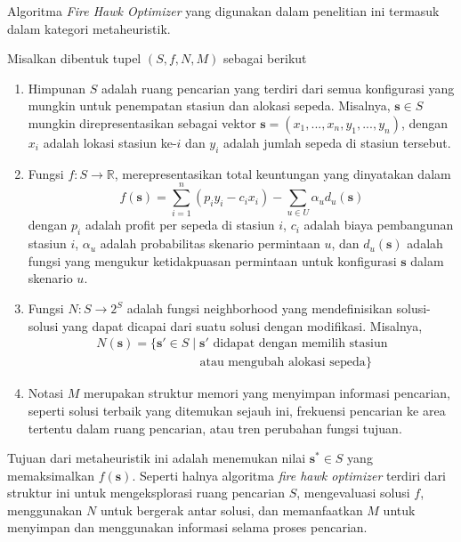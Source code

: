 Algoritma \textit{Fire Hawk Optimizer} yang digunakan dalam penelitian ini termasuk dalam kategori metaheuristik.

\begin{contoh}
Misalkan dibentuk tupel $(S, f, N, M)$ sebagai berikut
\begin{enumerate}
    \item Himpunan $S$ adalah ruang pencarian yang terdiri dari semua konfigurasi yang mungkin untuk penempatan stasiun dan alokasi sepeda. Misalnya, $\boldsymbol{s} \in S$ mungkin direpresentasikan sebagai vektor $\boldsymbol{s} = (x_1, ..., x_n, y_1, ..., y_n)$, dengan $x_i$ adalah lokasi stasiun ke-$i$ dan $y_i$ adalah jumlah sepeda di stasiun tersebut.
    
    \item Fungsi $f: S \rightarrow \mathbb{R}$, merepresentasikan total keuntungan yang dinyatakan dalam 
    $$f(\boldsymbol{s}) = \sum_{i=1}^n (p_i y_i - c_i x_i) - \sum_{u \in U} \alpha_u d_u(\boldsymbol{s})$$
    dengan $p_i$ adalah profit per sepeda di stasiun $i$, $c_i$ adalah biaya pembangunan stasiun $i$, $\alpha_u$ adalah probabilitas skenario permintaan $u$, dan $d_u(\boldsymbol{s})$ adalah fungsi yang mengukur ketidakpuasan permintaan untuk konfigurasi $\boldsymbol{s}$ dalam skenario $u$.
    
    \item Fungsi $N: S \rightarrow 2^S$ adalah fungsi neighborhood yang mendefinisikan solusi-solusi yang dapat dicapai dari suatu solusi dengan modifikasi. Misalnya,
    \begin{align*}
        N(\boldsymbol{s}) = \{\boldsymbol{s'} \in S \mid \boldsymbol{s'} \text{ didapat dengan memilih stasiun} \\
        \phantom{N(s) = \{s' \in S \mid} \text{atau mengubah alokasi sepeda}\}
    \end{align*}
    
    \item Notasi $M$ merupakan struktur memori yang menyimpan informasi pencarian, seperti solusi terbaik yang ditemukan sejauh ini, frekuensi pencarian ke area tertentu dalam ruang pencarian, atau tren perubahan fungsi tujuan.
\end{enumerate}

Tujuan dari metaheuristik ini adalah menemukan nilai $\boldsymbol{s^*} \in S$ yang memaksimalkan $f(\boldsymbol{s})$. Seperti halnya algoritma \textit{fire hawk optimizer} terdiri dari struktur ini untuk mengeksplorasi ruang pencarian $S$, mengevaluasi solusi $f$, menggunakan $N$ untuk bergerak antar solusi, dan memanfaatkan $M$ untuk menyimpan dan menggunakan informasi selama proses pencarian.

\end{contoh}
